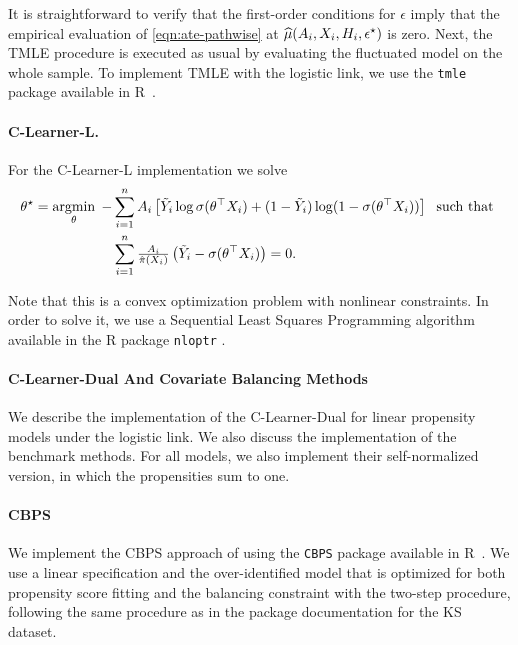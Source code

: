 It is straightforward to verify that the first-order conditions for $\epsilon$ imply that the empirical evaluation of \eqref{eqn:ate-pathwise} at $\widehat{\mu}(A_i,X_i,H_i,\epsilon^\star)$ is zero. Next, the TMLE procedure is executed as usual by evaluating the fluctuated model on the whole sample. To implement TMLE with the logistic link, we use the \texttt{tmle} package available in R~\citep{gruber2012tmle}. 

\paragraph{C-Learner-L.} For the C-Learner-L implementation we solve
\begin{align*}
\theta^\star = \mathop{\rm argmin}_{\theta} \; - &\sum_{i=1}^{n} A_i\left[ \tilde Y_i \log \sigma(\theta^\top X_i) + (1 - \tilde Y_i) \log (1 - \sigma(\theta^\top X_i)) \right]\;\text{ such that }\\ 
&\sum_{i=1}^{n} \tfrac{A_i}{\hat \pi(X_i)}\left( \tilde Y_i -\sigma(\theta^\top X_i) \right)=0. 
\end{align*}

Note that this is a convex optimization problem with nonlinear constraints. In order to solve it, we use a Sequential Least Squares Programming algorithm available in the R package \texttt{nloptr} \cite{nloptr2023}.


\ifdefined\response\newpage\newpage\clearpage\pagebreak\else\fi
\label{sec:dual_details}
\paragraph{C-Learner-Dual And Covariate Balancing Methods}

We describe the implementation of the C-Learner-Dual for linear propensity models under the logistic link. We also discuss the implementation of the benchmark methods. For all models, we also implement their self-normalized version, in which the propensities sum to one.


\paragraph{CBPS} We implement the CBPS approach of \cite{imai2014covariate} using the \texttt{CBPS} package available in R~\citep{gruber2012tmle}. We use a linear specification and the over-identified model that is optimized for both propensity score fitting and the balancing constraint with the two-step procedure, following the same procedure as in the package documentation for the KS dataset.


